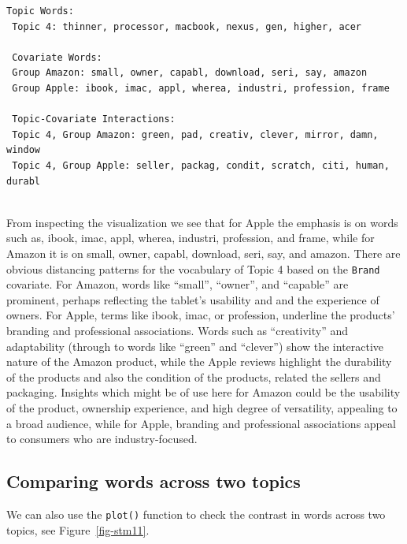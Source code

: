 \begin{verbatim}
Topic Words:
 Topic 4: thinner, processor, macbook, nexus, gen, higher, acer 
 
 Covariate Words:
 Group Amazon: small, owner, capabl, download, seri, say, amazon 
 Group Apple: ibook, imac, appl, wherea, industri, profession, frame 
 
 Topic-Covariate Interactions:
 Topic 4, Group Amazon: green, pad, creativ, clever, mirror, damn, window 
 Topic 4, Group Apple: seller, packag, condit, scratch, citi, human, durabl 
 
\end{verbatim}

From inspecting the visualization we see that for Apple the emphasis is on
words such as, ibook, imac, appl, wherea, industri, profession, and frame, while for Amazon it is on small, owner, capabl, download, seri,
say, and amazon. There are obvious distancing patterns for the vocabulary of Topic 4
based on the \texttt{Brand} covariate. For Amazon, words like
``small'', ``owner'', and ``capable'' are prominent, perhaps reflecting the tablet's
usability and and the experience of owners. For Apple, terms like
ibook, imac, or profession, underline the products' branding and professional
associations. Words such as ``creativity'' and
adaptability (through to  words like ``green'' and ``clever'') show the interactive nature of the Amazon product,
while the Apple reviews highlight the durability of the products and also
the condition of the products, related the sellers and packaging. Insights which might be of use here for Amazon could be the usability of
the product, ownership experience, and high degree of versatility, appealing to a
broad audience, while for Apple, branding and professional associations
appeal to consumers who are industry-focused.

\subsection{Comparing words across two
topics}\label{comparing-words-across-two-topics}

We can also use the \texttt{plot()} function to check the contrast in
words across two topics, see Figure~\ref{fig-stm11}.

\begin{Shaded}
\begin{Highlighting}[]
 \NormalTok{, } \NormalTok{(}\NormalTok{, }\NormalTok{))}
\end{Highlighting}
\end{Shaded}

